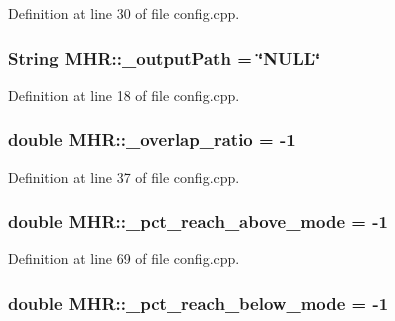 Definition at line 30 of file config.\+cpp.

\hypertarget{namespace_m_h_r_a15d81a6b22ae7616409d6df6101690eb}{
\subsubsection[{\+\_\+output\+Path}]{\setlength{\rightskip}{0pt plus 5cm}String M\+H\+R\+::\+\_\+output\+Path = \char`\"{}N\+U\+L\+L\char`\"{}}}\label{namespace_m_h_r_a15d81a6b22ae7616409d6df6101690eb}


Definition at line 18 of file config.\+cpp.

\hypertarget{namespace_m_h_r_aed0501a3045731a781439b11ee82fbfe}{
\subsubsection[{\+\_\+overlap\+\_\+ratio}]{\setlength{\rightskip}{0pt plus 5cm}double M\+H\+R\+::\+\_\+overlap\+\_\+ratio = -\/1}}\label{namespace_m_h_r_aed0501a3045731a781439b11ee82fbfe}


Definition at line 37 of file config.\+cpp.

\hypertarget{namespace_m_h_r_a3b2e38d795c8389fd066cefa0af2ef47}{
\subsubsection[{\+\_\+pct\+\_\+reach\+\_\+above\+\_\+mode}]{\setlength{\rightskip}{0pt plus 5cm}double M\+H\+R\+::\+\_\+pct\+\_\+reach\+\_\+above\+\_\+mode = -\/1}}\label{namespace_m_h_r_a3b2e38d795c8389fd066cefa0af2ef47}


Definition at line 69 of file config.\+cpp.

\hypertarget{namespace_m_h_r_acb8b09915d13e40eba7f00718c40ce6a}{
\subsubsection[{\+\_\+pct\+\_\+reach\+\_\+below\+\_\+mode}]{\setlength{\rightskip}{0pt plus 5cm}double M\+H\+R\+::\+\_\+pct\+\_\+reach\+\_\+below\+\_\+mode = -\/1}}\label{namespace_m_h_r_acb8b09915d13e40eba7f00718c40ce6a}


